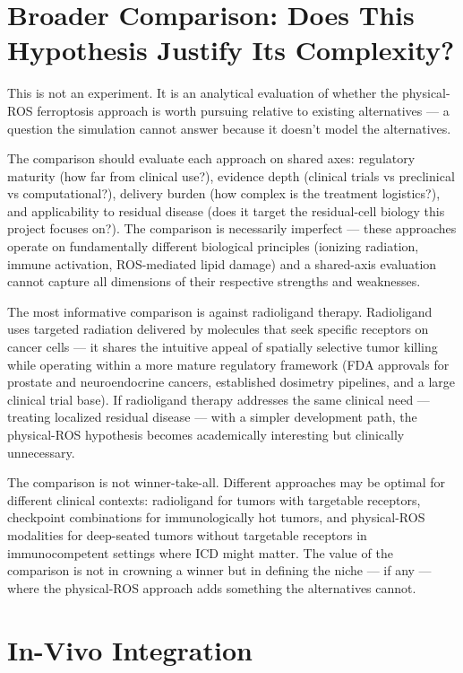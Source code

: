\documentclass[11pt,twoside,openright]{report}
\begin{document}
\section{Broader Comparison: Does This Hypothesis Justify Its Complexity?}

This is not an experiment. It is an analytical evaluation of whether the physical-ROS ferroptosis approach is worth pursuing relative to existing alternatives --- a question the simulation cannot answer because it doesn't model the alternatives.

The comparison should evaluate each approach on shared axes: regulatory maturity (how far from clinical use?), evidence depth (clinical trials vs preclinical vs computational?), delivery burden (how complex is the treatment logistics?), and applicability to residual disease (does it target the residual-cell biology this project focuses on?). The comparison is necessarily imperfect --- these approaches operate on fundamentally different biological principles (ionizing radiation, immune activation, ROS-mediated lipid damage) and a shared-axis evaluation cannot capture all dimensions of their respective strengths and weaknesses.

The most informative comparison is against radioligand therapy. Radioligand uses targeted radiation delivered by molecules that seek specific receptors on cancer cells --- it shares the intuitive appeal of spatially selective tumor killing while operating within a more mature regulatory framework (FDA approvals for prostate and neuroendocrine cancers, established dosimetry pipelines, and a large clinical trial base). If radioligand therapy addresses the same clinical need --- treating localized residual disease --- with a simpler development path, the physical-ROS hypothesis becomes academically interesting but clinically unnecessary.

The comparison is not winner-take-all. Different approaches may be optimal for different clinical contexts: radioligand for tumors with targetable receptors, checkpoint combinations for immunologically hot tumors, and physical-ROS modalities for deep-seated tumors without targetable receptors in immunocompetent settings where ICD might matter. The value of the comparison is not in crowning a winner but in defining the niche --- if any --- where the physical-ROS approach adds something the alternatives cannot.

\section{In-Vivo Integration}
\end{document}
